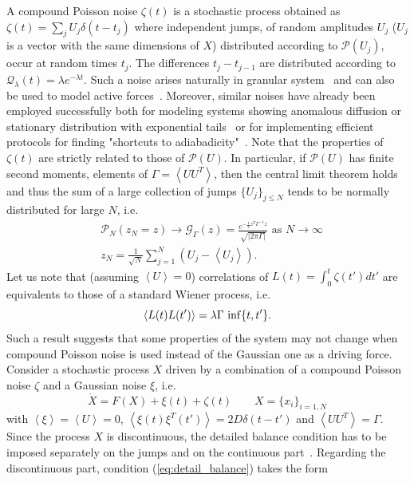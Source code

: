 \documentclass[12pt]{iopart}
\newcommand{\lx} {\left}
\newcommand{\rx} {\right}
\newcommand{\ave}[1] {\lx\langle #1 \rx\rangle}
\newcommand{\cP} {\mathcal{P}}
\newcommand{\cG} {\mathcal{G}}
\newcommand{\cQ} {\mathcal{Q}}
\begin{document}
A compound Poisson noise $\zeta(t)$ is a stochastic process obtained as $\zeta(t) = \sum_j U_j \delta(t-t_j)$ where independent jumps, of random amplitudes ${U_j}$ ($U_j$ is a vector with the same dimensions of $X$) distributed according to $\mathcal{P}(U_j)$, occur at random times ${t_j}$. 
The differences $t_j-t_{j-1}$ are distributed according to $\cQ_\lambda(t)=\lambda e^{-\lambda t}$.
Such a noise arises naturally in granular system~\cite{kanazawa2012stochastic,kanazawa2015minimal,kanazawa2015asymptotic,kanazawa2017statistical,lucente2023out} and can also be used to model active forces~\cite{zakine2017stochastic,fodor2018non,bialas2023mechanism}. Moreover, similar noises have already been employed successfully both for modeling systems showing anomalous diffusion or stationary distribution with exponential tails~\cite{eliazar2003levy,barkai2020packets} or for implementing efficient protocols for finding "shortcuts to adiabadicity"~\cite{baldovin2022shortcuts}. 
Note that the properties of $\zeta(t)$ are strictly related to those of $\cP(U)$. In particular, if $\cP(U)$ has finite second moments, elements of $\Gamma=\ave{UU^T}$, then the central limit theorem holds and thus the sum of a large collection of jumps $\{U_j\}_{j\le N}$ tends to be normally distributed for large $N$, i.e.
\begin{align}
&\cP_N(z_N=z)\to\cG_\Gamma(z) = \frac{e^{-\frac{1}{2}z^T\Gamma^{-1}z}}{\sqrt{|2\pi\Gamma|}} \text{ as } N\to \infty\\
&z_N=\frac{1}{\sqrt{N}}\sum_{j=1}^N (U_j-\ave{U_j}).
\end{align}
Let us note that (assuming $\ave{U}=0$) correlations of $L(t)=\int_{0}^{t}\zeta(t')dt'$ are equivalents to those of a standard Wiener process, i.e.
\begin{equation}
    \ave{L(t)L(t')} = \lambda \Gamma \,\,{\rm inf}\{t,t'\}.
\end{equation}
Such a result suggests that some properties of the system may not change when compound Poisson noise is used instead of the Gaussian one as a driving force. \\
Consider a stochastic process $X$ driven by a combination of a compound Poisson noise $\zeta$ and a Gaussian noise $\xi$, i.e.
\begin{equation}
    \dot{X} = F(X) + \xi(t) + \zeta(t) \qquad X=\{x_i\}_{i=1,N}
    \label{eq:Poisson_sde}
\end{equation}
with $\ave{\xi}=\ave{U}=0$, $\ave{\xi(t)\xi^T(t')}=2D\delta(t-t')$ and $\ave{UU^T}=\Gamma$.
Since the process $X$ is discontinuous, the detailed balance condition has to be imposed separately on the jumps and on the continuous part~\cite{G90}. Regarding the discontinuous part, condition (\ref{eq:detail_balance}) takes the form
\end{document}
